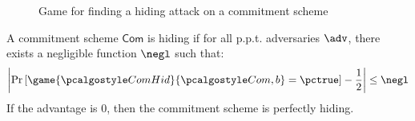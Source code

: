 
\begin{figure}[tbhp]
  \begin{center}
    \begin{tcolorbox}[width=8cm]
      \begin{pchstack}[center]
      \end{pchstack}
    \end{tcolorbox}
  \end{center}
  \caption{Game for finding a hiding attack on a commitment scheme \label{fig:break-com-hid}}
\end{figure}

A commitment scheme $\mathsf{Com}$ is hiding if for all p.p.t. adversaries $\adv$, there exists a negligible function $\negl$ such that:
\[ \left| \pr{\game{\algo{ComHid}}{\algo{Com}, b} = \pctrue} - \frac{1}{2} \right| \leq \negl \]
If the advantage is 0, then the commitment scheme is perfectly hiding.

